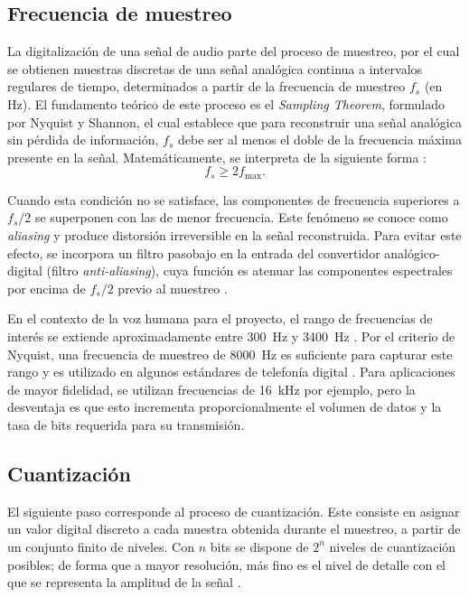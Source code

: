 \subsection{Frecuencia de muestreo}

La digitalización de una señal de audio parte del proceso de muestreo, por el cual se obtienen muestras discretas de una señal analógica continua a intervalos regulares de tiempo, determinados a partir de la frecuencia de muestreo $f_{s}$ (en \si{\hertz}).
El fundamento teórico de este proceso es el \textit{Sampling Theorem}, formulado por Nyquist y Shannon, el cual establece que para reconstruir una señal analógica sin pérdida de información, $f_s$ debe ser al menos el doble de la frecuencia máxima presente en la señal.
Matemáticamente, se interpreta de la siguiente forma \cite{pohlmann2005, haykin2007}:
\begin{equation}
    f_s \geq 2 f_{\max}.
\end{equation}

Cuando esta condición no se satisface, las componentes de frecuencia superiores a $f_s/2$ se superponen con las de menor frecuencia.
Este fenómeno se conoce como \textit{aliasing} y produce distorsión irreversible en la señal reconstruida.
Para evitar este efecto, se incorpora un filtro pasobajo en la entrada del convertidor analógico-digital (filtro \textit{anti-aliasing}), cuya función es atenuar las componentes espectrales por encima de $f_s/2$ previo al muestreo \cite{haykin2007}.

En el contexto de la voz humana para el proyecto, el rango de frecuencias de interés se extiende aproximadamente entre \SI{300}{\hertz} y \SI{3400}{\hertz} \cite{tanenbaum2011}.
Por el criterio de Nyquist, una frecuencia de muestreo de \SI{8000}{\hertz} es suficiente para capturar este rango y es utilizado en algunos estándares de telefonía digital \cite{haykin2007, li2014}.
Para aplicaciones de mayor fidelidad, se utilizan frecuencias de \SI{16}{\kilo\hertz} por ejemplo, pero la desventaja es que esto incrementa proporcionalmente el volumen de datos y la tasa de bits requerida para su transmisión.

\subsection{Cuantización}

El siguiente paso corresponde al proceso de cuantización.
Este consiste en asignar un valor digital discreto a cada muestra obtenida durante el muestreo, a partir de un conjunto finito de niveles.
Con $n$ bits se dispone de $2^n$ niveles de cuantización posibles; de forma que a mayor resolución, más fino es el nivel de detalle con el que se representa la amplitud de la señal \cite{pohlmann2005, haykin2007}.

